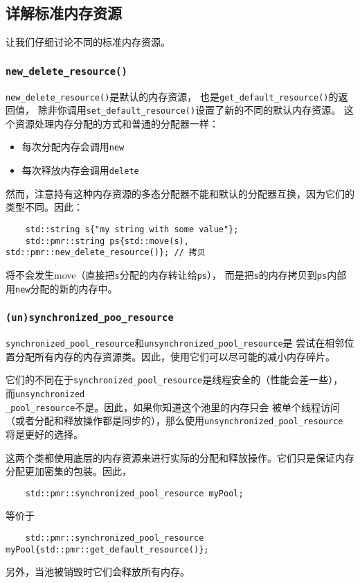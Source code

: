 \subsection{详解标准内存资源}
让我们仔细讨论不同的标准内存资源。

\subsubsection{\texttt{new\_delete\_resource()}}
\texttt{new\_delete\_resource()}是默认的内存资源，
也是\texttt{get\_default\_resource()}的返回值，
除非你调用\texttt{set\_default\_resource()}设置了新的不同的默认内存资源。
这个资源处理内存分配的方式和普通的分配器一样：
\begin{itemize}
    \item 每次分配内存会调用\texttt{new}
    \item 每次释放内存会调用\texttt{delete}
\end{itemize}
然而，注意持有这种内存资源的多态分配器不能和默认的分配器互换，因为它们的类型不同。因此：
\begin{lstlisting}
    std::string s{"my string with some value"};
    std::pmr::string ps{std::move(s), std::pmr::new_delete_resource()}; // 拷贝
\end{lstlisting}
将不会发生move（直接把\texttt{s}分配的内存转让给\texttt{ps}），
而是把\texttt{s}的内存拷贝到\texttt{ps}内部用\texttt{new}分配的新的内存中。

\subsubsection{\texttt{(un)synchronized\_poo\_resource}}
\texttt{synchronized\_pool\_resource}和\texttt{unsynchronized\_pool\_resource}是
尝试在相邻位置分配所有内存的内存资源类。因此，使用它们可以尽可能的减小内存碎片。

它们的不同在于\texttt{synchronized\_pool\_resource}是线程安全的（性能会差一些），
而\texttt{unsynchronized\\
\_pool\_resource}不是。因此，如果你知道这个池里的内存只会
被单个线程访问（或者分配和释放操作都是同步的），那么使用\texttt{unsynchronized\_pool\_resource}
将是更好的选择。

这两个类都使用底层的内存资源来进行实际的分配和释放操作。它们只是保证内存分配更加密集的包装。因此，
\begin{lstlisting}
    std::pmr::synchronized_pool_resource myPool;
\end{lstlisting}
等价于
\begin{lstlisting}
    std::pmr::synchronized_pool_resource myPool{std::pmr::get_default_resource()};
\end{lstlisting}
另外，当池被销毁时它们会释放所有内存。

